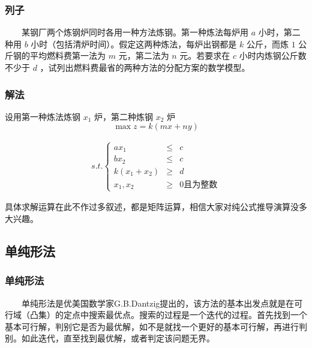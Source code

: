 \documentclass[slidestop,compress,mathserif,c]{beamer}
\begin{document}
\begin{frame}
\frametitle{列子}
~~~~某钢厂两个炼钢炉同时各用一种方法炼钢。第一种炼法每炉用  $ a $  小时，第二种用  $ b $  小时（包括清炉时间）。假定这两种炼法，每炉出钢都是 $ k $ 公斤，而炼  $ 1 $  公斤钢的平均燃料费第一法为  $ m $  元，第二法为  $ n $  元。若要求在  $ c $  小时内炼钢公斤数不少于  $ d $  ，试列出燃料费最省的两种方法的分配方案的数学模型。

\end{frame}


\begin{frame}
\frametitle{解法}
设用第一种炼法炼钢  $ x_1 $  炉，第二种炼钢  $ x_2 $  炉
 $$ \max z=k(mx+ny) $$ 
\begin{center}
  \begin{eqnarray*}
    s.t.\left\{
      \begin{array}{ccc}
        ax_1&\leq&c\\
        bx_2&\leq&c\\
        k(x_1+x_2)&\geq&d\\
        x_1,x_2&\geq&0 \mbox{且为整数}
    \end{array}\right.
    \end{eqnarray*}
  \end{center}
  具体求解运算在此不作过多叙述，都是矩阵运算，相信大家对纯公式推导演算没多大兴趣。
\end{frame}


\subsection{\hfill 单纯形法}
\begin{frame}
\frametitle{单纯形法}
~~~~单纯形法是优美国数学家G.B.Dantzig提出的，该方法的基本出发点就是在可行域（凸集）的定点中搜索最优点。搜索的过程是一个迭代的过程。首先找到一个基本可行解，判别它是否为最优解，如不是就找一个更好的基本可行解，再进行判别。如此迭代，直至找到最优解，或者判定该问题无界。

\end{frame}
\end{document}
